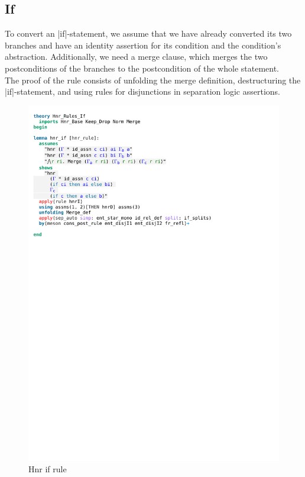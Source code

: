 \subsection{If}

To convert an |if|-statement, we assume that we have already converted its two branches and have an identity assertion for its condition and the condition's abstraction. Additionally, we need a merge clause, which merges the two postconditions of the branches to the postcondition of the whole statement.\\
The proof of the rule consists of unfolding the merge definition, destructuring the |if|-statement, and using rules for disjunctions in separation logic assertions.

\begin{figure}[htpb]
    \includegraphics[trim={0 21,9cm 0 2,4cm}, clip, width=1.00\textwidth]{figures/Theory_Hnr_Rules_If.pdf}
    \caption[Hnr if rule]{Hnr if rule}
    \label{fig:hnr_if}
\end{figure}

